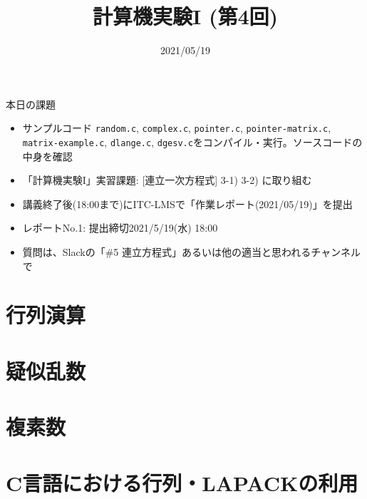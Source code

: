 \documentclass[10pt,dvipdfmx]{beamer}
\title{計算機実験I (第4回)}
\date{2021/05/19}
\begin{document}
\begin{frame}
  \titlepage
  \tableofcontents
\end{frame}

\begin{frame}[t]{本日の課題}
  \begin{itemize}
  \item サンプルコード {\tt random.c}, {\tt complex.c}, {\tt pointer.c}, {\tt pointer-matrix.c}, {\tt matrix-example.c}, {\tt dlange.c}, {\tt dgesv.c}をコンパイル・実行。ソースコードの中身を確認 \\
  \item 「計算機実験I」実習課題: [連立一次方程式] 3-1) 3-2) に取り組む
  \item 講義終了後(18:00まで)にITC-LMSで「作業レポート(2021/05/19)」を提出
  \item レポートNo.1: 提出締切2021/5/19(水) 18:00
  \item 質問は、Slackの「\#5 連立方程式」あるいは他の適当と思われるチャンネルで
  \end{itemize}
\end{frame}

\section{行列演算}


\section{疑似乱数}


\section{複素数}


\section{C言語における行列・LAPACKの利用}












%




%



\end{document}
